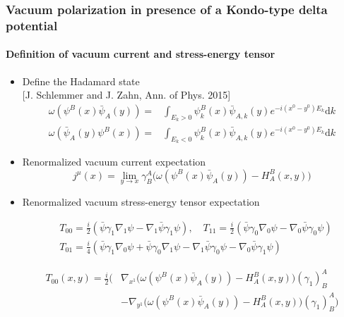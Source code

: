 \documentclass[english]{beamer}
\newcommand{\dd}[0]{\textrm{d}}
\begin{document}
\begin{frame}[shrink=30]
\frametitle{\small{Vacuum polarization in presence of a Kondo-type delta potential}}
\framesubtitle{Definition of vacuum current and stress-energy tensor}

\begin{itemize}
\item<1-> Define the Hadamard state
\\\tiny\color{blue}[J. Schlemmer and J. Zahn, Ann. of Phys. 2015]\color{black}\normalsize
\begin{equation*}
\begin{split}
\omega(\psi^B(x)\bar{\psi}_A(y)) = & \int_{E_k >0} \psi_k^B(x)\bar{\psi}_{A,k}(y)e^{-i(x^0-y^0)E_k} \dd k \\
\omega(\bar{\psi}_A(y)\psi^B(x)) = & \int_{E_k <0} \psi_k^B(x)\bar{\psi}_{A,k}(y)e^{-i(x^0-y^0)E_k} \dd k 
\end{split}
\end{equation*}
%
\item<2-> Renormalized vacuum current expectation
\begin{equation*}
j^\mu(x) = \lim_{y \rightarrow x} \gamma^A_B \big(
\omega(\psi^B(x)\bar{\psi}_A(y)) - H^B_A (x, y)\big)
\end{equation*}

%
\item<3-> Renormalized vacuum stress-energy tensor expectation

\begin{equation*}
\begin{split}
& T_{00} = \frac{i}{2} (\bar{\psi} \gamma_1 \nabla_1 \psi - \nabla_1 \bar{\psi}\gamma_1 \psi) , \quad
 T_{11} = \frac{i}{2} (\bar{\psi} \gamma_0 \nabla_0 \psi - \nabla_0 \bar{\psi}\gamma_0 \psi)  \\
& T_{01} = \frac{i}{4} (\bar{\psi} \gamma_1 \nabla_0 \psi +\bar{\psi} \gamma_0 \nabla_1 \psi - \nabla_1 \bar{\psi}\gamma_0 \psi - \nabla_0 \bar{\psi}\gamma_1 \psi)  
\end{split}
\end{equation*}

\begin{equation*}
\begin{split}
T_{00}(x,y) = 
\frac{i}{2}\Big( & 
\nabla_{x^1}\big(\omega(  \psi^B(x) \bar{\psi}_A(y))-H^B_A(x,y)\big)(\gamma_1)^A_B \\
& - \nabla_{y^1}\Big(\omega( \psi^B(x)  \bar{\psi}_A(y)) - H^B_A(x,y)\big)(\gamma_1)^A_B \Big)   
\end{split}
\end{equation*}

\end{itemize}
\end{frame}
\end{document}
